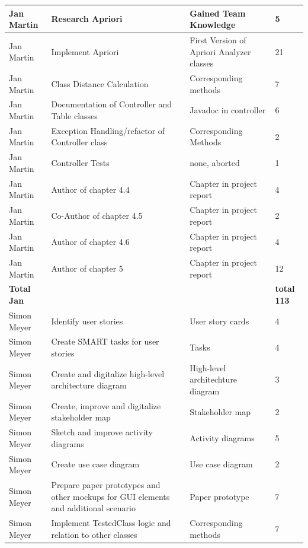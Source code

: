 \begin{longtable}{|p{}||p{}|p{}|p{}|}
    \hline  
    Jan Martin & Research Apriori & Gained Team Knowledge & 5 \\ 
    \hline  
    Jan Martin & Implement Apriori & First Version of Apriori Analyzer classes & 21 \\ 
    \hline  
    Jan Martin & Class Distance Calculation & Corresponding methods & 7 \\ 
    \hline  
    Jan Martin & Documentation of Controller and Table classes & Javadoc in controller & 6 \\ 
    \hline    
    Jan Martin & Exception Handling/refactor of Controller class & Corresponding Methods & 2 \\ 
    \hline  
    Jan Martin & Controller Tests & none, aborted & 1 \\ 
    \hline  
    Jan Martin & Author of chapter 4.4 & Chapter in project report & 4 \\ 
    \hline
    Jan Martin & Co-Author of chapter 4.5 & Chapter in project report & 2 \\
    \hline 
    Jan Martin & Author of chapter 4.6 & Chapter in project report & 4 \\ 
    \hline
    Jan Martin & Author of chapter 5 & Chapter in project report & 12 \\ 
    \hline
    \hline 
    \textbf{Total \newline Jan} & & & \textbf{total 113}   \\
    \hline
    \hline
    Simon Meyer & Identify user stories & User story cards & 4 \\
    \hline
    Simon Meyer & Create SMART tasks for user stories & Tasks & 4 \\
    \hline
    Simon Meyer & Create and digitalize high-level architecture diagram & High-level architechture diagram & 3 \\ 
    \hline
    Simon Meyer & Create, improve and digitalize stakeholder map & Stakeholder map & 2 \\ 
    \hline
    Simon Meyer & Sketch and improve activity diagrams & Activity diagrams & 5 \\ 
    \hline
    Simon Meyer & Create use case diagram & Use case diagram & 2 \\ 
    \hline
    Simon Meyer & Prepare paper prototypes and other mockups for GUI elements and additional scenario & Paper prototype & 7 \\
    \hline
    Simon Meyer & Implement TestedClass logic and relation to other classes & Corresponding methods & 7 \\ 

\end{longtable}
